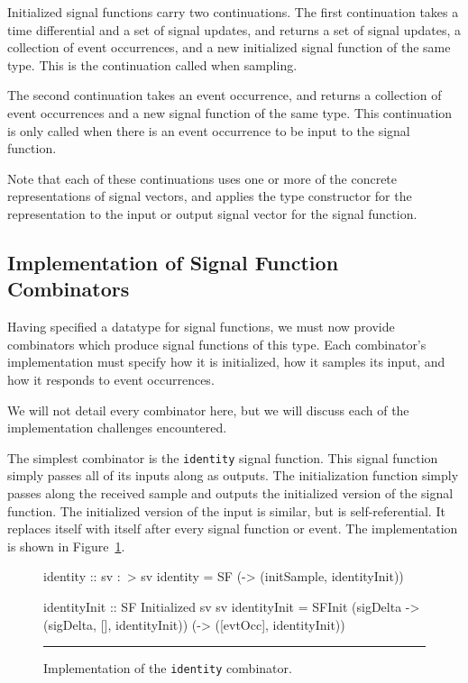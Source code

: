Initialized signal functions carry two continuations. The first continuation
takes a time differential and a set of signal updates, and returns a set of
signal updates, a collection of event occurrences, and a new initialized signal
function of the same type. This is the continuation called when sampling.

The second continuation takes an event occurrence, and returns a collection of
event occurrences and a new signal function of the same type. This continuation
is only called when there is an event occurrence to be input to the signal
function.

Note that each of these continuations uses one or more of the concrete
representations of signal vectors, and applies the type constructor for the
representation to the input or output signal vector for the signal function.

\subsection{Implementation of Signal Function Combinators}
\label{subsection:Implementation-Signal_Functions-Implementation_of_Signal_Function_Combinators}

Having specified a datatype for signal functions, we must now provide
combinators which produce signal functions of this type. Each combinator's
implementation must specify how it is initialized, how it samples its input, and
how it responds to event occurrences.

We will not detail every combinator here, but we will discuss each of the
implementation challenges encountered.

The simplest combinator is the {\tt identity} signal function. This signal
function simply passes all of its inputs along as outputs. The initialization
function simply passes along the received sample and outputs the initialized
version of the signal function. The initialized version of the input is similar,
but is self-referential. It replaces itself with itself after every signal
function or event. The implementation is shown in Figure~\ref{figure:identity_implementation}.

\begin{figure}
\begin{code}
identity :: sv :~> sv
identity =
  SF (\initSample -> (initSample, identityInit))

identityInit :: SF Initialized sv sv
identityInit =
  SFInit (\dt sigDelta -> (sigDelta, [], identityInit))
         (\evtOcc -> ([evtOcc], identityInit))
\end{code}
\hrule
\caption{Implementation of the {\tt identity} combinator.}
\label{figure:identity_implementation}
\end{figure}

